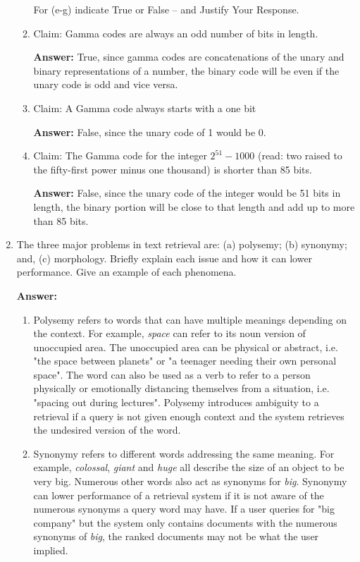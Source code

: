 \documentclass[11pt]{article}
\begin{document}
\begin{enumerate}
\begin{enumerate}
                For (e-g) indicate True or False -- and Justify Your Response.
          \item Claim: Gamma codes are always an odd number of bits in length.

                \textbf{Answer:} True, since gamma codes are concatenations of the unary and binary representations of a number, the binary code will be even if the unary code is odd and vice versa.

          \item Claim: A Gamma code always starts with a one bit

                \textbf{Answer:} False, since the unary code of 1 would be 0.

          \item Claim: The Gamma code for the integer $2^{51} - 1000$ (read: two raised to the fifty-first power minus one
                thousand) is shorter than 85 bits.

                \textbf{Answer:} False, since the unary code of the integer would be 51 bits in length, the binary portion will be close to that length and add up to more than 85 bits.

        \end{enumerate}

  \item The three major problems in text retrieval are: (a) polysemy; (b) synonymy; and, (c) morphology. Briefly explain each issue and how it can lower performance. Give an example of each phenomena.

        \textbf{Answer:} \begin{enumerate}
          \item Polysemy refers to words that can have multiple meanings depending on the context. For example, \textit{space} can refer to its noun version of unoccupied area. The unoccupied area can be physical or abstract, i.e. "the space between planets" or "a teenager needing their own personal space". The word can also be used as a verb to refer to a person physically or emotionally distancing themselves from a situation, i.e. "spacing out during lectures".
                Polysemy introduces ambiguity to a retrieval if a query is not given enough context and the system retrieves the undesired version of the word.

          \item Synonymy refers to different words addressing the same meaning. For example, \textit{colossal}, \textit{giant} and \textit{huge} all describe the size of an object to be very big. Numerous other words also act as synonyms for \textit{big}.
                Synonymy can lower performance of a retrieval system if it is not aware of the numerous synonyms a query word may have. If a user queries for "big company" but the system only contains documents with the numerous synonyms of \textit{big}, the ranked documents may not be what the user implied.


\end{enumerate}
\end{enumerate}
\end{document}
